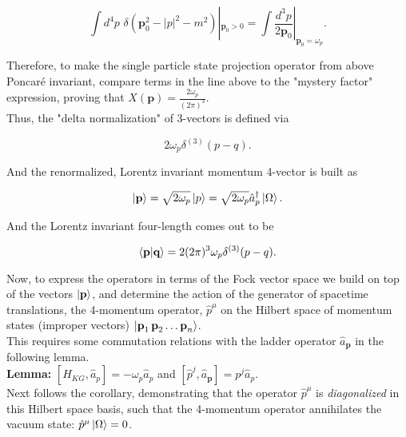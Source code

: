 \begin{equation}
\int d^4 p \,\, \delta(\textbf{p}_0^2 - |p|^2 - m^2)|_{\textbf{p}_0>0} = \int \frac{d^3 p}{2\textbf{p}_0}|_{\textbf{p}_0=\omega_{p}}.
\end{equation}

\noindent Therefore, to make the single particle state projection operator from above Poncar\'e invariant, compare terms in the line above to the "mystery factor" expression, proving that $X(\textbf{p}) = \frac{2 \omega_p}{(2\pi)^3}$. \\

\noindent Thus, the "delta normalization" of 3-vectors is defined via 

\begin{equation}
2 \omega_{p} \delta^{(3)} (p-q).
\end{equation}

\noindent And the renormalized, Lorentz invariant momentum 4-vector is built as 

\begin{equation}
\ket{\textbf{p}} = \sqrt{2 \omega_{p}} \ket{p} = \sqrt{2 \omega_{p}} \hat{a}_{p}^\dagger \ket{\Omega}.
\end{equation}

\noindent And the Lorentz invariant four-length comes out to be

\begin{equation}
\braket{\textbf{p}|\textbf{q}} = 2 (2 \pi)^3 \omega_{p} \delta^{(3)} (p - q). 
\end{equation}

\noindent Now, to express the operators in terms of the Fock vector space we build on top of the vectors $\ket{\textbf{p}}$, and determine the action of the generator of spacetime translations, the 4-momentum operator, $\hat{p}^\mu$ on the Hilbert space of momentum states (improper vectors) $\ket{\textbf{p}_1 \, \textbf{p}_2 \dots \textbf{p}_n}$. \\

\noindent This requires some commutation relations with the ladder operator $\hat{a}_{\textbf{p}}$ in the following lemma. \\

\noindent \textbf{Lemma:} $[ \hat{H}_{KG}, \hat{a}_p ] = - \omega_{p} \hat{a}_{p}$ and $[ \hat{p}^j, \hat{a}_\textbf{p} ] = p^j \hat{a}_p $. \\

\noindent Next follows the corollary, demonstrating that the operator $\hat{p}^\mu$ is \textit{diagonalized} in this Hilbert space basis, such that the 4-momentum operator annihilates the vacuum state: $\hat{p}^\mu \ket{\Omega} = 0$. \\

